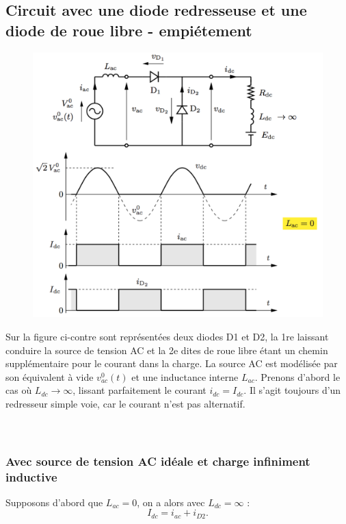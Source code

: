 	\subsection{Circuit avec une diode redresseuse et une diode de roue libre - empiétement}
		\begin{figure}
		\vspace{-5mm}
		\includegraphics[scale=0.3]{ch2/5}
		\end{figure}
		Sur la figure ci-contre sont représentées deux diodes D1 et D2, la 1re laissant conduire la source de tension AC et la 2e dites de roue libre étant un chemin supplémentaire pour le courant dans la charge. La source AC est modélisée par son équivalent à vide $v_{ac}^0(t)$ et une inductance interne $L_{ac}$. Prenons d'abord le cas où $L_{dc} \rightarrow \infty$, lissant parfaitement le courant $i_{dc} = I_{dc}$. Il s'agit toujours d'un redresseur simple voie, car le courant n'est pas alternatif. \\\\\\
		
		\subsubsection{Avec source de tension AC idéale et charge infiniment inductive}
			Supposons d'abord que $L_{ac} = 0$, on a alors avec $L_{dc} = \infty$ : 
			\begin{equation}
				I_{dc} = i_{ac} + i_{D2}.
			\end{equation}
			
